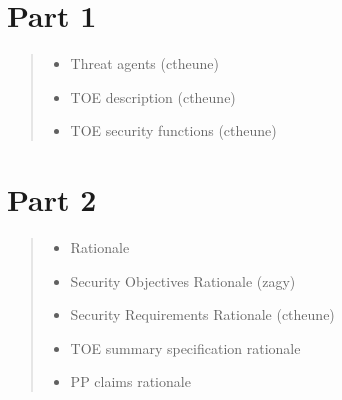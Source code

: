 \documentclass[12pt,english]{scrbook}
\begin{document}



\section{Part 1}
\begin{quote}
\begin{itemize}
\item {} 
Threat agents (ctheune)

\item {} 
TOE description (ctheune)

\item {} 
TOE security functions (ctheune)

\end{itemize}
\end{quote}





\section{Part 2}
\begin{quote}
\begin{itemize}
\item {} 
Rationale

\item {} 
Security Objectives Rationale (zagy)

\item {} 
Security Requirements Rationale (ctheune)

\item {} 
TOE summary specification rationale

\item {} 
PP claims rationale

\end{itemize}
\end{quote}
\end{document}
